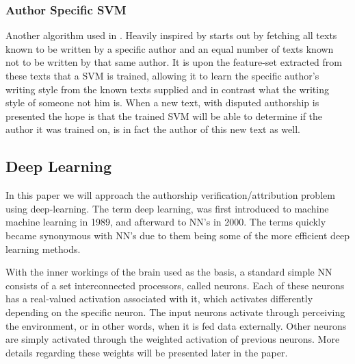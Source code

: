 \subsubsection{Author Specific SVM}

Another algorithm used in \cite{US}. Heavily inspired by \cite{hansen2014}
starts out by fetching all texts known to be written by a specific author and an
equal number of texts known not to be written by that same author. It is upon
the feature-set extracted from these texts that a \gls{SVM} is trained, allowing
it to learn the specific author's writing style from the known texts supplied
and in contrast what the writing style of someone not him is. When a new text,
with disputed authorship is presented the hope is that the trained \gls{SVM}
will be able to determine if the author it was trained on, is in fact the author
of this new text as well.


\subsection{Deep Learning}

In this paper we will approach the authorship verification/attribution problem
using deep-learning. The term deep learning, was first introduced to
machine machine learning in 1989, and afterward to \gls{NN}'s in 2000. The terms
quickly became synonymous with \gls{NN}'s due to them being some of the more
efficient deep learning methods.\cite{Schmidhuber:2015}

With the inner workings of the brain used as the basis, a standard simple
\gls{NN} consists of a set interconnected processors, called neurons. Each of
these neurons has a real-valued activation associated with it, which activates
differently depending on the specific neuron. The input neurons activate through
perceiving the environment, or in other words, when it is fed data externally.
Other neurons are simply activated through the weighted activation of previous
neurons. More details regarding these weights will be presented later in the
paper.\cite{DBLP:journals/corr/Schmidhuber14}

